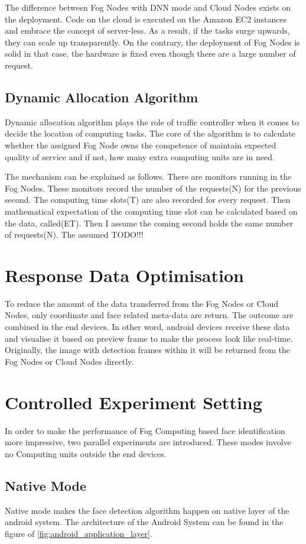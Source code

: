 The difference between Fog Nodes with DNN mode and Cloud Nodes exists on the deployment. Code on the cloud is executed on the Amazon EC2 instances and embrace the concept of server-less. As a result, if the tasks surge upwards, they can scale up transparently. On the contrary, the deployment of Fog Nodes is solid in that case, the hardware is fixed even though there are a large number of request.

\subsection{Dynamic Allocation Algorithm}
Dynamic allocation algorithm plays the role of traffic controller when it comes to decide the location of computing tasks. The core of the algorithm is to calculate whether the assigned Fog Node owns the competence of maintain expected quality of service and if not, how many extra computing units are in need.

The mechanism can be explained as follows. There are monitors running in the Fog Nodes. These monitors record the number of the requests(N) for the previous second. The computing time slots(T) are also recorded for every request. Then mathematical expectation of the computing time slot can be calculated based on the data, called(ET). Then I assume the coming second holds the same number of requests(N). The assumed {TODO!!!}

\section{Response Data Optimisation}
To reduce the amount of the data transferred from the Fog Nodes or Cloud Nodes, only coordinate and face related meta-data are return. The outcome are combined in the end devices. In other word, android devices receive these data and visualise it based on preview frame to make the process look like real-time. Originally, the image with detection frames within it will be returned from the Fog Nodes or Cloud Nodes directly. 

\section{Controlled Experiment Setting}
In order to make the performance of Fog Computing based face identification more impressive, two parallel experiments are introduced. These modes involve no Computing units outside the end devices.

\subsection{Native Mode}
Native mode makes the face detection algorithm happen on native layer of the android system. The architecture of the Android System can be found in the figure of \ref{fig:android_application_layer}.

